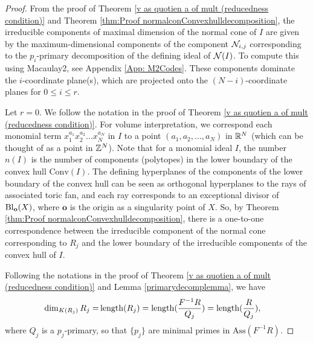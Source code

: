 \documentclass[11pt,a4paper,leqno,noamsfonts]{amsart}
\numberwithin{equation}{section}
\begin{document}
\begin{proof} From the proof of Theorem \ref{v as quotien a of mult (reducedness condition)} and Theorem \ref{thm:Proof normalconConvexhulldecomposition}, the irreducible components of maximal dimension of the normal cone of $I$ are given by the maximum-dimensional components of the component ${\mathcal N}_{i,j}$ corresponding to  the $p_i$-primary decomposition of the defining ideal of ${\mathcal N}(I)$. To compute this using Macaulay2, see Appendix \ref{App: M2Codes}. 
These components dominate the $i$-coordinate plane(s),  which are projected onto the $(N-i)$-coordinate planes for $0 \leq i \leq r$.





 Let $r=0$. We follow the notation in the proof of Theorem \ref{v as quotien a of mult (reducedness condition)}. For volume interpretation, we correspond each monomial term $x_1^{a_{1}}x_2^{a_{2}}\ldots x_N^{a_{N}}$ in $I$ to a point $(a_{1},a_{2},\ldots,a_{N})$ in ${\mathbb{R}}^N$ (which can be thought of as a point in ${\mathbb{Z}}^N$). Note that for a monomial ideal $I$, the number $n(I)$ is the number of components (polytopes) in the lower boundary of the convex hull $\mathrm{Conv}(I)$.  The defining hyperplanes of the components of the lower boundary of the convex hull can be seen as orthogonal hyperplanes to the rays of associated toric fan, and each ray corresponds to an exceptional divisor of $\operatorname{Bl}_{\mathbf{o}}(X)$, where $\mathbf{o}$ is the origin as a singularity point of $X$. 
So, by Theorem \ref{thm:Proof normalconConvexhulldecomposition}, there is a one-to-one correspondence between the irreducible component of the normal cone corresponding to $R_j$ and the lower boundary of the irreducible components of the convex hull of $I$. 
 
 

Following the notations in the proof of Theorem \ref{v as quotien a of mult (reducedness condition)} and Lemma \ref{primarydecomplemma}, we have
 \begin{align*}
 \dim_{K(R_j)}R_j=& \operatorname{length}(R_j)=\operatorname{length}(\frac{F^{-1}R}{Q_j})=\operatorname{length}(\frac{R}{Q_j}),\end{align*} 
  where $Q_j$ is a $p_j$-primary, so that $\{p_j\}$ are minimal primes in $\mathrm{Ass}(F^{-1}R)$. 

  




\end{proof}
\end{document}
